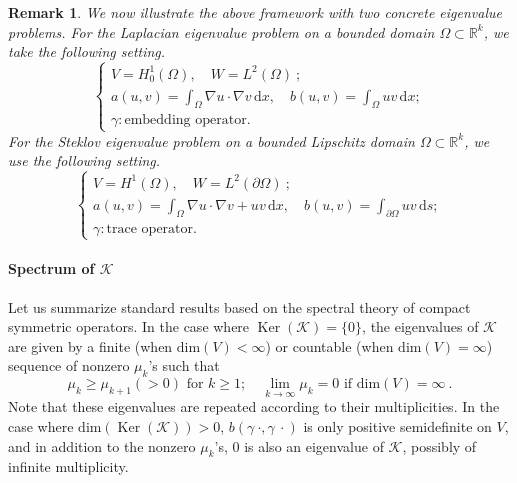 \documentclass[a4,11pt]{article}
\numberwithin{equation}{section}
\newtheorem{remark}[theorem]{Remark}
\begin{document}
\begin{remark}\label{re:evp-examples}
We now illustrate the above framework with two concrete eigenvalue problems.
For the Laplacian eigenvalue problem on a bounded domain 
$\Omega \subset \mathbb{R}^k$, we take the following setting.
\begin{equation}
\label{eq:setting-laplacian-EVP}
  \left\{
    \begin{array}{l} 
      \displaystyle V=H^1_0(\Omega),  \quad W=L^2(\Omega)~; \\
      \displaystyle a(u,v)=\int_{\Omega} \nabla u \cdot \nabla v  \,\mbox{d}x, \quad b(u,v)=\int_{\Omega} u v  \,\mbox{d}x;\\
      \gamma : \mbox{embedding operator}.  
    \end{array}
  \right.
\end{equation}
For the Steklov eigenvalue problem on a bounded Lipschitz domain $\Omega \subset \mathbb{R}^k$, we use the following setting.
\begin{equation}
\label{eq:setting-steklov-EVP}
  \left\{
    \begin{array}{l} 
      \displaystyle V=H^1(\Omega),  \quad W=L^2(\partial \Omega)~; \\
      \displaystyle a(u,v)=\int_{\Omega} \nabla u \cdot \nabla v + uv \,\mbox{d}x, \quad b(u,v)=\int_{\partial \Omega} u v  \,\mbox{d}s;\\
      \gamma : \mbox{trace operator}.  
    \end{array}
  \right.
\end{equation}
\end{remark}

\medskip

\paragraph{\bf Spectrum of $\mathcal{K} $}
Let us summarize standard results based on the spectral theory of compact symmetric operators.
In the case where $\operatorname{Ker}(\mathcal{K} )=\{0\}$,
the eigenvalues of $\mathcal{K} $ are given by a finite (when $\mbox{dim}(V)<\infty$) or countable (when $\mbox{dim}(V)=\infty$) sequence of nonzero $\mu_k$'s such that 
$$
\mu_k \ge \mu_{k+1}(>0) \mbox{ for }k\ge 1; \quad  \lim_{k\to \infty}  \mu_k =0 \mbox{ if } \mbox{dim}(V)=\infty ~.
$$
Note that these eigenvalues are repeated according to their multiplicities. 
In the case where  $\mbox{dim}(\operatorname{Ker}(\mathcal{K} ))>0$,  
$b(\gamma ~ \cdot ,\gamma ~ \cdot )$ is only positive semidefinite on $V$, and in addition to the nonzero $\mu_k$'s, $0$  is also an eigenvalue of $\mathcal{K} $, possibly of infinite multiplicity.
\end{document}
